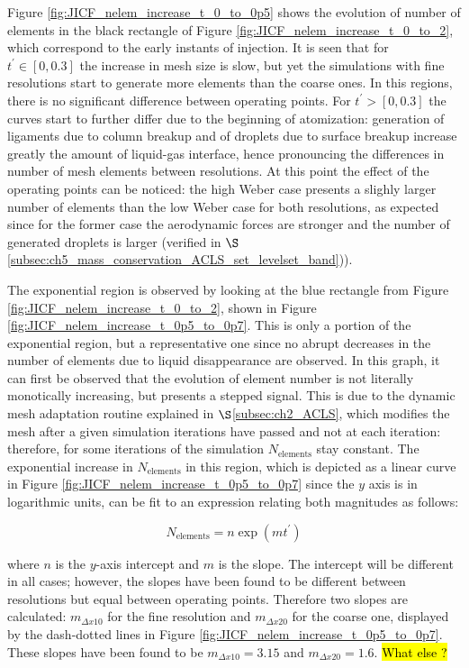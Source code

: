 Figure \ref{fig:JICF_nelem_increase_t_0_to_0p5} shows the evolution of number of elements in the black rectangle of Figure \ref{fig:JICF_nelem_increase_t_0_to_2}, which correspond to the early instants of injection. It is seen that for $t^{\prime} \in [0, 0.3]$ the increase in mesh size is slow, but yet the simulations with fine resolutions start to generate more elements than the coarse ones. In this regions, there is no significant difference between operating points. For $t^{\prime} > [0, 0.3]$ the curves start to further differ due to the beginning of atomization: generation of ligaments due to column breakup and of droplets due to surface breakup increase greatly the amount of liquid-gas interface, hence pronouncing the differences in number of mesh elements between resolutions. At this point the effect of the operating points can be noticed: the high Weber case presents a slighly larger number of elements than the low Weber case for both resolutions, as expected since for the former case the aerodynamic forces are stronger and the number of generated droplets is larger (verified in $\S$\ref{subsec:ch5_mass_conservation_ACLS_set_levelset_band})).

The exponential region is observed by looking at the blue rectangle from Figure \ref{fig:JICF_nelem_increase_t_0_to_2}, shown in Figure \ref{fig:JICF_nelem_increase_t_0p5_to_0p7}. This is only a portion of the exponential region, but a representative one since no abrupt decreases in the number of elements due to liquid disappearance are observed. In this graph, it can first be observed that the evolution of element number is not literally monotically increasing, but presents a stepped signal. This is due to the dynamic mesh adaptation routine explained in $\S$\ref{subsec:ch2_ACLS}, which modifies the mesh after a given simulation iterations have passed and not at each iteration: therefore, for some iterations of the simulation $N_\mathrm{elements}$ stay constant. The exponential increase in $N_\mathrm{elements}$ in this region, which is depicted as a linear curve in Figure \ref{fig:JICF_nelem_increase_t_0p5_to_0p7} since the $y$ axis is in logarithmic units, can be fit to an expression relating both magnitudes as follows:

\begin{equation}
N_\mathrm{elements} = n \exp \left( m t^{\prime} \right)
\end{equation}

where $n$ is the $y$-axis intercept and $m$ is the slope. The intercept will be different in all cases; however, the slopes have been found to be different between resolutions but equal between operating points. Therefore two slopes are calculated: $m_{\Delta x10}$ for the fine resolution and $m_{\Delta x20}$ for the coarse one, displayed by the dash-dotted lines in Figure \ref{fig:JICF_nelem_increase_t_0p5_to_0p7}. These slopes have been found to be $m_{\Delta x10} = 3.15$ and $m_{\Delta x20} = 1.6$. \hl{What else ?}

